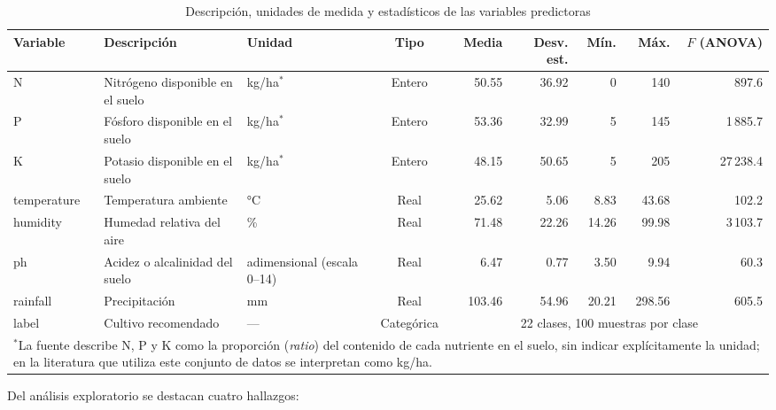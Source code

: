 \documentclass[conference]{IEEEtran}
\begin{document}
\begin{table}[htbp]
\caption{Descripción, unidades de medida y estadísticos de las variables predictoras}
\label{tab:variables}
\centering
\footnotesize
\setlength{\tabcolsep}{4pt}
\begin{tabular}{lllcrrrrr}
\toprule
\textbf{Variable} & \textbf{Descripción} & \textbf{Unidad} & \textbf{Tipo} & \textbf{Media} & \textbf{Desv. est.} & \textbf{Mín.} & \textbf{Máx.} & \textbf{$F$ (ANOVA)} \\
\midrule
N & Nitrógeno disponible en el suelo & kg/ha$^{\ast}$ & Entero & 50.55 & 36.92 & 0 & 140 & 897.6 \\
P & Fósforo disponible en el suelo & kg/ha$^{\ast}$ & Entero & 53.36 & 32.99 & 5 & 145 & 1\,885.7 \\
K & Potasio disponible en el suelo & kg/ha$^{\ast}$ & Entero & 48.15 & 50.65 & 5 & 205 & 27\,238.4 \\
temperature & Temperatura ambiente & °C & Real & 25.62 & 5.06 & 8.83 & 43.68 & 102.2 \\
humidity & Humedad relativa del aire & \% & Real & 71.48 & 22.26 & 14.26 & 99.98 & 3\,103.7 \\
ph & Acidez o alcalinidad del suelo & adimensional (escala 0--14) & Real & 6.47 & 0.77 & 3.50 & 9.94 & 60.3 \\
rainfall & Precipitación & mm & Real & 103.46 & 54.96 & 20.21 & 298.56 & 605.5 \\
\midrule
label & Cultivo recomendado & --- & Categórica & \multicolumn{5}{c}{22 clases, 100 muestras por clase} \\
\bottomrule
\multicolumn{9}{p{0.95\textwidth}}{\scriptsize $^{\ast}$La fuente describe N, P y K como la proporción (\emph{ratio}) del contenido de cada nutriente en el suelo, sin indicar explícitamente la unidad; en la literatura que utiliza este conjunto de datos se interpretan como kg/ha.}
\end{tabular}
\end{table}

Del análisis exploratorio se destacan cuatro hallazgos:
\end{document}
